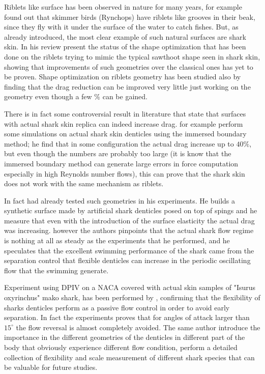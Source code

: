 Riblets like surface has been observed in nature for many years, for example \citet{Martin2016riblets} found out that skimmer birds (Rynchops) have riblets like grooves in their beak, since they fly with it under the surface of the water to catch fishes.
But, as already introduced, the most clear example of such natural surfaces are shark skin.
In his review \citet{dean2010shark} present the status of the shape optimization that has been done on the riblets trying to mimic the typical sawthoot shape seen in shark skin, showing that improvements of such geometries over the classical ones has yet to be proven.
Shape optimization on riblets geometry has been studied also by \citet{bechert1997experiments} finding that the drag reduction can be improved very little just working on the geometry even though a few $\%$ can be gained.

There is in fact some controversial result in literature that state that surfaces with actual shark skin replica can indeed increase drag.
\citet{boomsma2016direct} for example perform some simulations on actual shark skin denticles using the immersed boundary method; he find that in some configuration 
the actual drag increase up to $40\%$, but even though the numbers are probably too large (it is know that the immersed boundary method can generate large errors in force computation especially in high Reynolds number flows), this can prove that the shark skin does not work with the same mechanism as riblets.

In fact \citet{bechert1997natural} had already tested such geometries in his experiments. 
He builds a synthetic surface made by artificial shark denticles posed on top of spings and he measure that even with the introduction of the surface elasticity the actual drag was increasing.
however the authors pinpoints that the actual shark flow regime is nothing at all as steady as the experiments that he performed, and he speculates that the excellent swimming performance of the shark came from the separation control that flexible denticles can increase in the periodic oscillating flow that the swimming generate.

Experiment using DPIV on a NACA covered with actual skin samples of "Isurus oxyrinchus" mako shark, has been performed by \citet{lang2014SharkControl}, confirming that the flexibility of sharks denticles perform as a passive flow control in order to avoid early separation.
In fact the experiments proves that for angles of attack larger than $15^{\circ}$ the flow reversal is almost completely avoided.
The same author introduce the importance in the different geometries of the denticles in different part of the body that obviously experience different flow condition,
\citet{motta2012Shark} perform a detailed collection of flexibility and scale measurement of different shark species that can be valuable for future studies.

